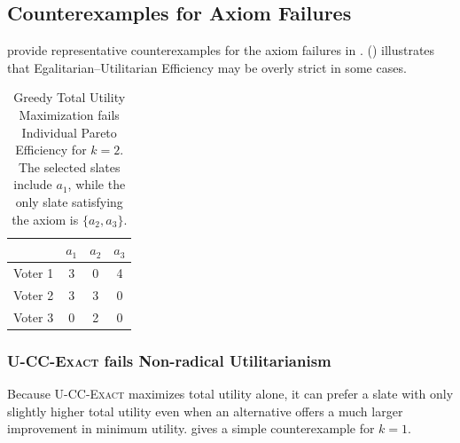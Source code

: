 \documentclass[letterpaper]{article} %
\newcommand{\Exact}{\textsc{U-CC-Exact}}
\begin{document}


\subsection{Counterexamples for Axiom Failures}
\label{app:voting-failures}

 provide representative counterexamples for the axiom failures in .
 () illustrates that Egalitarian--Utilitarian Efficiency may be overly strict in some cases.

\begin{table}[t]
\centering
\begin{tabular}{l|ccc}
\hline
 & $a_1$ & $a_2$ & $a_3$ \\
\hline
Voter 1 & 3 & 0 & 4 \\
Voter 2 & 3 & 3 & 0 \\
Voter 3 & 0 & 2 & 0 \\
\hline
\end{tabular}
\caption{Greedy Total Utility Maximization fails Individual Pareto Efficiency for $k=2$.
The selected slates include \(a_1\), while the only slate satisfying the axiom is \(\{a_2,a_3\}\).}
\label{tab:failure-greedy-indiv-pareto}
\end{table}

\subsubsection{\Exact{} fails Non-radical Utilitarianism}
\label{app:exact-nru}

Because \Exact{} maximizes total utility alone, it can prefer a slate with only slightly higher total utility even when an alternative offers a much larger improvement in minimum utility.
 gives a simple counterexample for \(k=1\).
\end{document}

